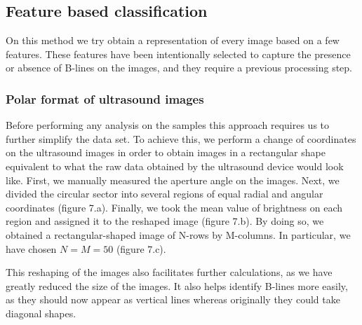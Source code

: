\documentclass[11pt]{article} %
\begin{document}
\subsection{Feature based classification}
On this method we try obtain a representation of every image based on a few features. These features have been intentionally selected to capture the presence or absence of B-lines on the images, and they require a previous processing step.

\subsubsection{Polar format of ultrasound images}

	Before performing any analysis on the samples this approach requires us to further simplify the data set. To achieve this, we perform a change of coordinates on the ultrasound images in order to obtain images in a rectangular shape equivalent to what the raw data obtained by the ultrasound device would look like. First, we manually measured the aperture angle on the images. Next, we divided the circular sector into several regions of equal radial and angular coordinates (figure 7.a). Finally, we took the mean value of brightness on each region and assigned it to the reshaped image (figure 7.b). By doing so, we obtained a rectangular-shaped image of N-rows by M-columns. In particular, we have chosen $N = M = 50$ (figure 7.c).
	
	This reshaping of the images also facilitates further calculations, as we have greatly reduced the size of the images. It also helps identify B-lines more easily, as they should now appear as vertical lines whereas originally they could take diagonal shapes. 
	
\end{document}
